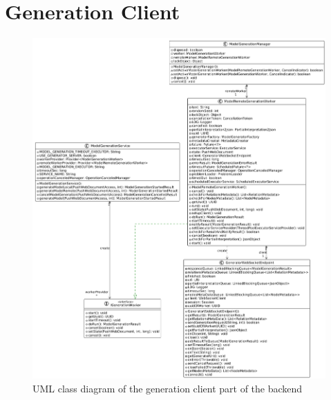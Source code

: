 \clearpage\section{Generation Client}
\begin{figure}[h!]
		\includegraphics[scale=0.35]{include/imgs/generation_client_UML.png}
		\caption{UML class diagram of the generation client part of the backend}
		\label{backendclientuml}
\end{figure}

